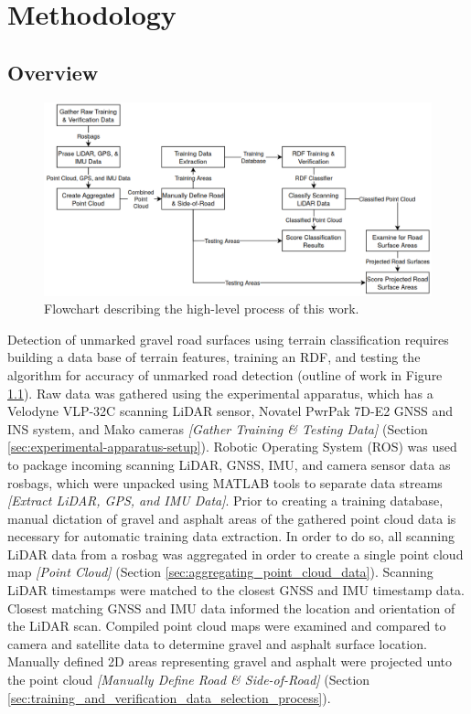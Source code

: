 \documentclass[numbered,pdftex]{ohio-etd}
\begin{document}
\chapter{Methodology}{
	
	\section{Overview}
		
		\begin{figure}[H]
			\centering
			\includegraphics[width=0.9\linewidth]{Defense_Images/flowz_7}
			\caption[Project Flow]{Flowchart describing the high-level process of this work.}
			\label{fig:flowz_7}
		\end{figure}
		
		{Detection of unmarked gravel road surfaces using terrain classification requires building a data base of terrain features, training an RDF, and testing the algorithm for accuracy of unmarked road detection (outline of work in Figure \ref{fig:flowz_7}). Raw data was gathered using the experimental apparatus, which has a Velodyne VLP-32C scanning LiDAR sensor, Novatel PwrPak 7D-E2 GNSS and INS system, and Mako cameras \textit{[Gather Training \& Testing Data]} (Section \ref{sec:experimental-apparatus-setup}). Robotic Operating System (ROS) was used to package incoming scanning LiDAR, GNSS, IMU, and camera sensor data as rosbags, which were unpacked using MATLAB tools to separate data streams \textit{[Extract LiDAR, GPS, and IMU Data]}. Prior to creating a training database, manual dictation of gravel and asphalt areas of the gathered point cloud data is necessary for automatic training data extraction. In order to do so, all scanning LiDAR data from a rosbag was aggregated in order to create a single point cloud map \textit{[Point Cloud]} (Section \ref{sec:aggregating_point_cloud_data}). Scanning LiDAR timestamps were matched to the closest GNSS and IMU timestamp data. Closest matching GNSS and IMU data informed the location and orientation of the LiDAR scan. Compiled point cloud maps were examined and compared to camera and satellite data to determine gravel and asphalt surface location. Manually defined 2D areas representing gravel and asphalt were projected unto the point cloud \textit{[Manually Define Road \& Side-of-Road]} (Section \ref{sec:training_and_verification_data_selection_process}).}

}
\end{document}
